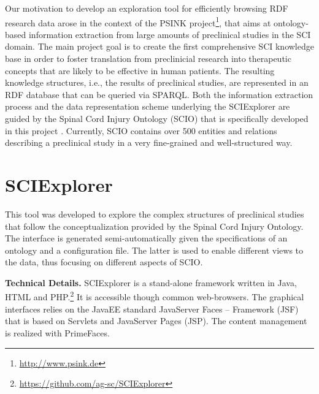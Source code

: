 \documentclass[runningheads,a4paper]{llncs}
\begin{document}
Our motivation to develop an exploration tool for efficiently browsing RDF research data arose in the context of the PSINK project\footnote{\url{http://www.psink.de}}, that aims at ontology-based information extraction from large amounts of preclinical studies in the SCI domain. The main project goal is to create the first comprehensive SCI knowledge base in order to foster translation from preclinicial research into therapeutic concepts that are likely to be effective in human patients. The resulting knowledge structures, i.e., the results of preclinical studies, are represented in an RDF database that can be queried via SPARQL. Both the information extraction process and the data representation scheme underlying the SCIExplorer are guided by the Spinal Cord Injury Ontology (SCIO) that is specifically developed in this project  \cite{__RefNumPara__9937_1959585331}. Currently, SCIO contains over 500 entities and relations describing a preclinical study in a very fine-grained and well-structured way.

\section{SCIExplorer}

This tool was developed to explore the complex structures of preclinical studies that follow the conceptualization provided by the Spinal Cord Injury Ontology. The interface is generated semi-automatically given the specifications of an ontology and a configuration file. The latter is used to enable different views to the data, thus focusing on different aspects of SCIO.

{\bf Technical Details. }SCIExplorer is a stand-alone framework written in Java, HTML and PHP.\footnote{\url{https://github.com/ag-sc/SCIExplorer}} It is accessible though common web-browsers. The graphical interfaces relies on the JavaEE standard JavaServer Faces -- Framework (JSF) that is based on Servlets and JavaServer Pages (JSP). The content management is realized with PrimeFaces. 
\end{document}
